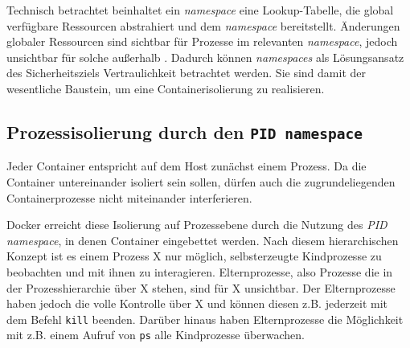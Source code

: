 \documentclass[../main.tex]{subfiles}
\begin{document}
		Technisch betrachtet beinhaltet ein \emph{namespace} eine Lookup-Tabelle, die global verfügbare Ressourcen abstrahiert und dem \emph{namespace} bereitstellt. Änderungen globaler Ressourcen sind sichtbar für Prozesse im relevanten \emph{namespace}, jedoch unsichtbar für solche außerhalb \cite[S.1+2]{IBMcheckpointRestart}\cite{namespaces}. Dadurch können \emph{namespaces} als Lösungsansatz des Sicherheitsziels Vertraulichkeit betrachtet werden. Sie sind damit der wesentliche Baustein, um eine Containerisolierung zu realisieren.



		\subsection{Prozessisolierung durch den \texttt{\acrshort{PID} namespace}}
		\label{secIsoProcesses}

			Jeder Container entspricht auf dem Host zunächst einem Prozess. Da die Container untereinander isoliert sein sollen, dürfen auch die zugrundeliegenden Containerprozesse nicht miteinander interferieren.

			Docker erreicht diese Isolierung auf Prozessebene durch die Nutzung des \emph{\acrshort{PID} namespace}, in denen Container eingebettet werden. Nach diesem hierarchischen Konzept ist es einem Prozess X nur möglich, selbsterzeugte Kindprozesse zu beobachten und mit ihnen zu interagieren. Elternprozesse, also Prozesse die in der Prozesshierarchie über X stehen, sind für X unsichtbar. Der Elternprozesse haben jedoch die volle Kontrolle über X und können diesen z.B. jederzeit mit dem Befehl \texttt{kill} beenden. Darüber hinaus haben Elternprozesse die Möglichkeit mit z.B. einem Aufruf von \texttt{ps} alle Kindprozesse überwachen.
\end{document}
